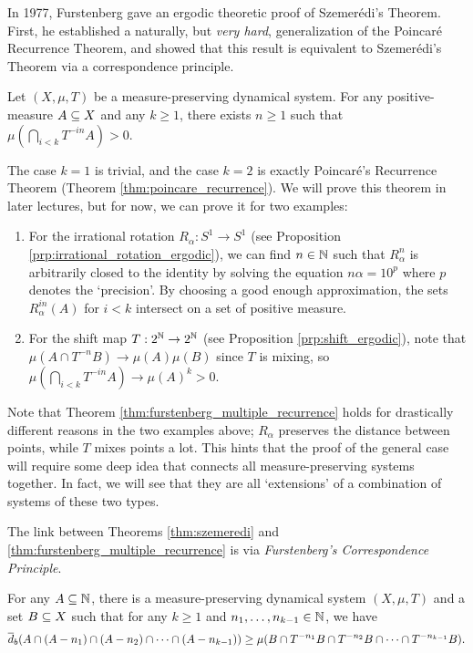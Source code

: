 \documentclass[reqno, twoside]{article}
\begin{document}
    In 1977, Furstenberg \cite{Fur77} gave an ergodic theoretic proof of Szemerédi's Theorem. First, he established a naturally, but \textit{very hard}, generalization of the Poincaré Recurrence Theorem, and showed that this result is equivalent to Szemerédi's Theorem via a correspondence principle.

    \begin{theorem}\label{thm:furstenberg_multiple_recurrence}
        Let $(X,\mu,T)$ be a measure-preserving dynamical system. For any positive-measure $A\subseteq X$ and any $k\geq1$, there exists $n\geq1$ such that $\mu(\bigcap_{i<k}T^{-in}A)>0$.
    \end{theorem}

    The case $k=1$ is trivial, and the case $k=2$ is exactly Poincaré's Recurrence Theorem (Theorem \ref{thm:poincare_recurrence}). We will prove this theorem in later lectures, but for now, we can prove it for two examples:
    \begin{enumerate}
        \item For the irrational rotation $R_\alpha:S^1\to S^1$ (see Proposition \ref{prp:irrational_rotation_ergodic}), we can find $n\in\mathbb{N}$ such that $R_\alpha^n$ is arbitrarily closed to the identity by solving the equation $n\alpha=10^p$ where $p$ denotes the `precision'. By choosing a good enough approximation, the sets $R_\alpha^{in}(A)$ for $i<k$ intersect on a set of positive measure.
            \vspace{-0.22in}
        \item For the shift map $T:2^{\mathbb{N}}\to2^{\mathbb{N}}$ (see Proposition \ref{prp:shift_ergodic}), note that $\mu(A\cap T^{-n}B)\to\mu(A)\mu(B)$ since $T$ is mixing, so $\mu(\bigcap_{i<k}T^{-in}A)\to\mu(A)^k>0$.
    \end{enumerate}
    Note that Theorem \ref{thm:furstenberg_multiple_recurrence} holds for drastically different reasons in the two examples above; $R_\alpha$ preserves the distance between points, while $T$ mixes points a lot. This hints that the proof of the general case will require some deep idea that connects all measure-preserving systems together. In fact, we will see that they are all `extensions' of a combination of systems of these two types.

    The link between Theorems \ref{thm:szemeredi} and \ref{thm:furstenberg_multiple_recurrence} is via \textit{Furstenberg's Correspondence Principle}.

    \begin{theorem}\label{thm:furstenberg_correspondence}
        For any $A\subseteq\mathbb{N}$, there is a measure-preserving dynamical system $(X,\mu,T)$ and a set $B\subseteq X$ such that for any $k\geq1$ and $n_1,\dots,n_{k-1}\in\mathbb{N}$, we have
        \vspace{-0.05in}
        \begin{equation*}
            \bar{d}_b(A\cap(A-n_1)\cap(A-n_2)\cap\cdots\cap(A-n_{k-1}))\geq\mu(B\cap T^{-n_1}B\cap T^{-n_2}B\cap\cdots\cap T^{-n_{k-1}}B).
            \vspace{-0.05in}
        \end{equation*}
    \end{theorem}
\end{document}
